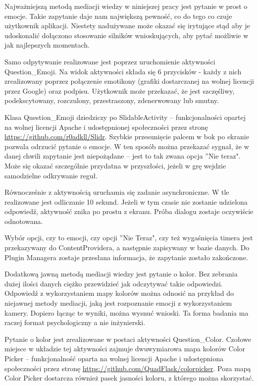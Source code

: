 Najważniejszą metodą mediacji wiedzy w niniejszej pracy jest pytanie w prost o emocje. Takie zapytanie daje nam największą pewność, co do tego co czuje użytkownik aplikacji. Niestety nadużywane może okazać się irytujące stąd aby je udoskonalić dołączono stosowanie silników wnioskujących, aby pytać możliwie w jak najlepszych momentach. 

Samo odpytywanie realizowane jest poprzez uruchomienie aktywności Question\_Emoji. Na widok aktywności składa się 6 przycisków - każdy z nich zrealizowany poprzez połączenie emotikony (grafiki dostarczanej na wolnej licencji przez Google) oraz podpisu. Użytkownik może przekazać, że jest szczęśliwy, podekscytowany, rozczulony, przestraszony, zdenerwowany lub smutny.

Klasa Question\_Emoji dziedziczy po SlidableActivity -- funkcjonalności opartej na wolnej licencji Apache i udostępnionej społeczności przez stronę \url{https://github.com/r0adkll/Slidr}. Szybkie przesunięcie palcem w bok po ekranie pozwala odrzucić pytanie o emocje. W ten sposób można przekazać sygnał, że w danej chwili zapytanie jest niepożądane -- jest to tak zwana opcja ''Nie teraz". Może się okazać szczególnie przydatna w przyszłości, jeżeli w grę wejdzie samodzielne odkrywanie reguł.

Równocześnie z aktywnością uruchamia się zadanie asynchroniczne. W tle realizowane jest odliczanie 10 sekund. Jeżeli w tym czasie nie zostanie udzielona odpowiedź, aktywność znika po prostu z ekranu. Próba dialogu zostaje oczywiście odnotowana.

Wybór opcji, czy to emocji, czy opcji ''Nie Teraz", czy też wygaśnięcia timera jest przekazywany do ContentProvidera, a następnie zapisywany w bazie danych. Do Plugin Managera zostaje przesłana informacja, że zapytanie zostało zakończone.

Dodatkową jawną metodą mediacji wiedzy jest pytanie o kolor. Bez zebrania dużej ilości danych ciężko przewidzieć jak odczytywać takie odpowiedzi. Odpowiedź z wykorzystaniem mapy kolorów można odnosić na przykład do niejawnej metody mediacji, jaką jest rozpoznanie emocji z wykorzystaniem kamery. Dopiero łącząc te wyniki, można wysnuć wnioski. Ta forma badania ma raczej format psychologiczny a nie inżynierski. 

Pytanie o kolor jest zrealizowane w postaci aktywności Question\_Color. Czołowe miejsce w układzie tej aktywności zajmuje dwuwymiarowa mapa kolorów Color Picker -- funkcjonalność oparta na wolnej licencji Apache i udostępniona społeczności przez stronę \url{https://github.com/QuadFlask/colorpicker}. Poza mapą Color Picker dostarcza również pasek jasności koloru, z którego można skorzystać. 

